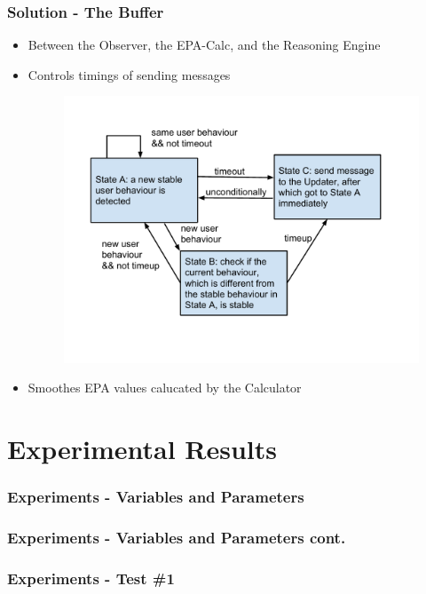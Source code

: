 \documentclass{beamer}
\begin{document}
\begin{frame}
\frametitle{Solution - The Buffer}
\begin{itemize}
\item Between the Observer, the EPA-Calc, and the Reasoning Engine
\item Controls timings of sending messages
\begin{figure}
\centering
\includegraphics[trim = 10mm 25mm 16mm 15mm, clip, width=0.75\linewidth]{fig/fig-state-trans.pdf}
\end{figure}
\item Smoothes EPA values calucated by the Calculator
\end{itemize}
\end{frame}

\section{Experimental Results}
\begin{frame}
\frametitle{Experiments - Variables and Parameters}
\end{frame}

\begin{frame}
\frametitle{Experiments - Variables and Parameters cont.}
\end{frame}

\begin{frame}
\frametitle{Experiments - Test \#1}
\end{frame}
\end{document}
